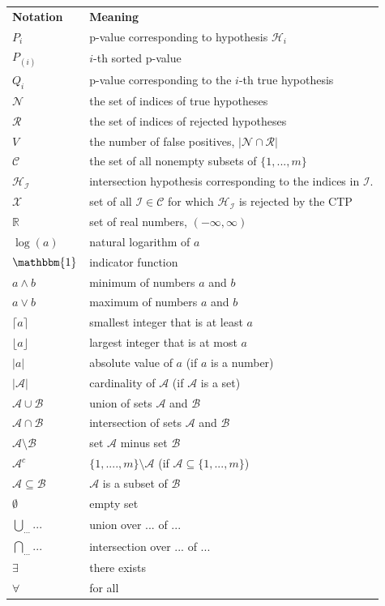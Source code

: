 \documentclass[11pt]{article}
\theoremstyle{plain}
\theoremstyle{definition}
\newcommand{\reals}{\mathbb{R}}
\newcommand{\N}{\mathcal{N}}
\newcommand{\R}{\mathcal{R}}
\newcommand{\I}{\mathcal{I}}
\newcommand{\X}{\mathcal{X}}
\newcommand{\C}{\mathcal{C}}
\newcommand{\Hy}{\mathcal{H}}
\newcommand{\subs}{\mathcal{C}}
\begin{document}
\begin{tabular}{ll}
\textbf{Notation} & \textbf{Meaning} \\

$P_i$ & p-value corresponding to hypothesis $\Hy_i$ \\
$P_{(i)}$ & $i$-th sorted p-value\\
$Q_i$ & p-value corresponding to the $i$-th true hypothesis \\
$\N$ & the set of indices of true hypotheses\\
$\R$ & the set of indices of rejected hypotheses\\
$V$ &  the number of false positives, $|\N\cap \R|$\\
$\subs$ & the set of all nonempty subsets of $\{1,...,m\}$\\
$\Hy_{\I}$ &  intersection hypothesis corresponding to the indices in $\I$.\\
$\X$ &  set of all $\I\in \C$ for which $\Hy_{\I}$ is rejected by the CTP\\
$\reals$ &  set of real numbers, $(-\infty,\infty)$ \\
$\log(a)$ &  natural logarithm of  $a$\\
$\mathbbm{1}$ & indicator function\\
$a\wedge b$ & minimum of numbers  $a$ and $b$\\
$a\vee b$ & maximum of numbers  $a$ and $b$\\ 
$\lceil a \rceil$ & smallest integer that is at least $a$\\ 
$\lfloor a \rfloor$ & largest integer that is at most $a$\\ 
$|a|$ & absolute value of $a$ (if $a$ is a number)\\
$|\mathcal{A}|$ & cardinality of $\mathcal{A}$  (if $\mathcal{A}$ is a set)\\
$\mathcal{A}\cup \mathcal{B}$ & union of sets $\mathcal{A}$ and $\mathcal{B}$\\
$\mathcal{A}\cap \mathcal{B}$ & intersection of sets $\mathcal{A}$ and $\mathcal{B}$ \\
$\mathcal{A}\setminus \mathcal{B}$ & set $\mathcal{A}$ minus set $\mathcal{B}$ \\
$\mathcal{A}^c$ &$\{1,....,m\}\setminus\mathcal{A}$ (if $\mathcal{A}\subseteq \{1,...,m\}$) \\
$\mathcal{A}\subseteq \mathcal{B}$ & $\mathcal{A}$ is a subset of $\mathcal{B}$\\
$\emptyset$ &  empty set \\
$\bigcup_{...}...$ & union over ... of ... \\
$\bigcap_{...}...$ & intersection over ... of ... \\
$\exists$ & there exists\\
$\forall$ & for all\\
\end{tabular}
\end{document}
